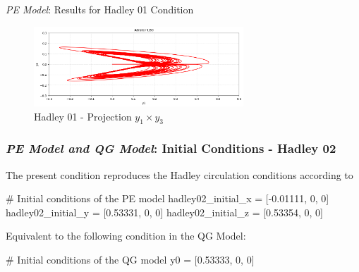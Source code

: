 
\begin{frame}{\textit{PE Model}: Results for Hadley 01 Condition}
	\begin{figure}
		\centering
		\includegraphics[width=0.7\textwidth]{img/p02y1y3.png}
		\caption{Hadley 01 - Projection $y_1 \times y_3$}
		\label{fig:p02y1y3}
	\end{figure}
\end{frame}


\begin{frame}[fragile]
		
	\frametitle{\textit{PE Model and QG Model}: Initial Conditions - Hadley 02}
	The present condition reproduces the Hadley circulation conditions according to \cite{lorenz1980}
	\begin{python}
# Initial conditions of the PE model
hadley02_initial_x = [-0.01111, 0, 0]
hadley02_initial_y = [0.53331, 0, 0]
hadley02_initial_z = [0.53354, 0, 0]
	\end{python}
		
	Equivalent to the following condition in the QG Model:
	\begin{python}
# Initial conditions of the QG model
y0 = [0.53333, 0, 0]
	\end{python}
\end{frame}


